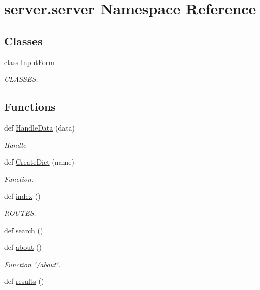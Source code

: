\hypertarget{namespaceserver_1_1server}{}\section{server.\+server Namespace Reference}
\label{namespaceserver_1_1server}
\subsection*{Classes}
\begin{DoxyCompactItemize}
\item 
class \mbox{\hyperlink{classserver_1_1server_1_1_input_form}{Input\+Form}}
\begin{DoxyCompactList}\small\item\em C\+L\+A\+S\+S\+ES. \end{DoxyCompactList}\end{DoxyCompactItemize}
\subsection*{Functions}
\begin{DoxyCompactItemize}
\item 
def \mbox{\hyperlink{namespaceserver_1_1server_a59e9bd350bd3f6864626e826a5d07e61}{Handle\+Data}} (data)
\begin{DoxyCompactList}\small\item\em Handle \end{DoxyCompactList}\item 
def \mbox{\hyperlink{namespaceserver_1_1server_a06b6b48a36458a5e63d37667433c2080}{Create\+Dict}} (name)
\begin{DoxyCompactList}\small\item\em Function. \end{DoxyCompactList}\item 
def \mbox{\hyperlink{namespaceserver_1_1server_ab3d96b92729f42de2866e0cb876a0a71}{index}} ()
\begin{DoxyCompactList}\small\item\em R\+O\+U\+T\+ES. \end{DoxyCompactList}\item 
def \mbox{\hyperlink{namespaceserver_1_1server_ae5d697d5408aeb2f94e2aa610a4706aa}{search}} ()
\item 
def \mbox{\hyperlink{namespaceserver_1_1server_a7bdc96668852473d18262dd1185ac3d9}{about}} ()
\begin{DoxyCompactList}\small\item\em Function \char`\"{}/about\char`\"{}. \end{DoxyCompactList}\item 
def \mbox{\hyperlink{namespaceserver_1_1server_a83a8086e94730016efda959e40b9cfaf}{results}} ()
\end{DoxyCompactItemize}
